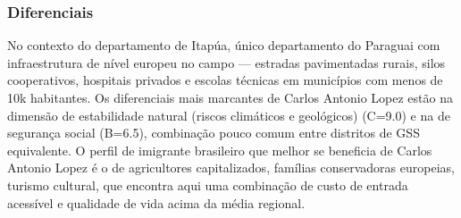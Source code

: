 \subsubsection*{Diferenciais}\label{dif-carlos-antonio-lopez-0709}
No contexto do departamento de Itapúa, único departamento do Paraguai com infraestrutura de nível europeu no campo — estradas pavimentadas rurais, silos cooperativos, hospitais privados e escolas técnicas em municípios com menos de 10k habitantes. Os diferenciais mais marcantes de Carlos Antonio Lopez estão na dimensão de estabilidade natural (riscos climáticos e geológicos) (C=9.0) e na de segurança social (B=6.5), combinação pouco comum entre distritos de GSS equivalente. O perfil de imigrante brasileiro que melhor se beneficia de Carlos Antonio Lopez é o de agricultores capitalizados, famílias conservadoras europeias, turismo cultural, que encontra aqui uma combinação de custo de entrada acessível e qualidade de vida acima da média regional.
